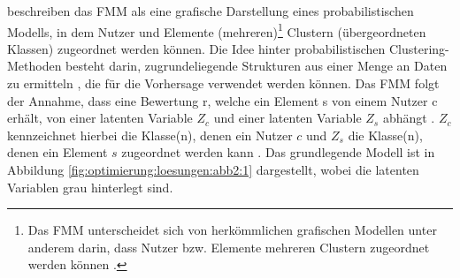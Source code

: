 \textcite[S. 358]{jin:article} beschreiben das \ac{FMM} als eine grafische Darstellung eines probabilistischen Modells, in dem Nutzer und Elemente (mehreren)\footnote{Das \ac{FMM} unterscheidet sich von herkömmlichen grafischen Modellen unter anderem darin, dass Nutzer bzw. Elemente mehreren Clustern zugeordnet werden können \cite[S. 3]{si:inproceedings}\cite[S. 366]{jin:article}.} Clustern (übergeordneten Klassen) zugeordnet werden können.
Die Idee hinter probabilistischen Clustering-Methoden besteht darin, zugrundeliegende Strukturen aus einer Menge an Daten zu ermitteln \cite[S. 197]{truyen:inproceedings}, die für die Vorhersage verwendet werden können.
Das \ac{FMM} folgt der Annahme, dass eine Bewertung r, welche ein Element s von einem Nutzer c erhält, von einer latenten Variable $Z_{c}$ und einer latenten Variable $Z_{s}$ abhängt \cite[S. 235]{sahoo:article}.
$Z_{c}$ kennzeichnet hierbei die Klasse(n), denen ein Nutzer $c$ und ${Z_{s}}$ die Klasse(n), denen ein Element $s$ zugeordnet werden kann \cite[S. 862]{adomavicius:4:inbook}\cite[S. 3]{si:inproceedings}.
Das grundlegende Modell ist in Abbildung \ref{fig:optimierung:loesungen:abb2:1} dargestellt, wobei die latenten Variablen grau hinterlegt sind.

